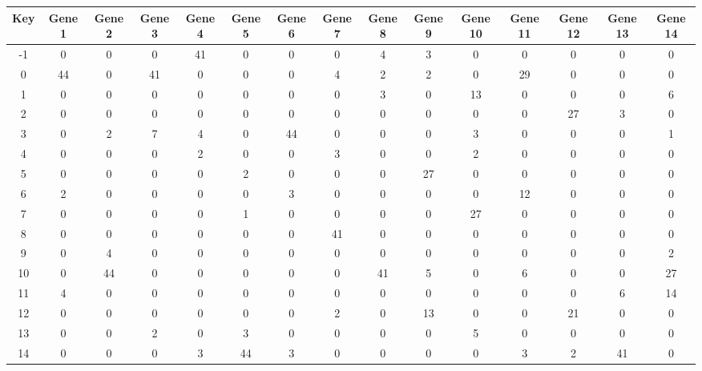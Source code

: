 \begin{tabular}{|c|c|c|c|c|c|c|c|c|c|c|c|c|c|c|}
\hline
Key & Gene 1 & Gene 2 & Gene 3 & Gene 4 & Gene 5 & Gene 6 & Gene 7 & Gene 8 & Gene 9 & Gene 10 & Gene 11 & Gene 12 & Gene 13 & Gene 14 \\
\hline
-1 & 0 & 0 & 0 & 41 & 0 & 0 & 0 & 4 & 3 & 0 & 0 & 0 & 0 & 0 \\
0 & 44 & 0 & 41 & 0 & 0 & 0 & 4 & 2 & 2 & 0 & 29 & 0 & 0 & 0 \\
1 & 0 & 0 & 0 & 0 & 0 & 0 & 0 & 3 & 0 & 13 & 0 & 0 & 0 & 6 \\
2 & 0 & 0 & 0 & 0 & 0 & 0 & 0 & 0 & 0 & 0 & 0 & 27 & 3 & 0 \\
3 & 0 & 2 & 7 & 4 & 0 & 44 & 0 & 0 & 0 & 3 & 0 & 0 & 0 & 1 \\
4 & 0 & 0 & 0 & 2 & 0 & 0 & 3 & 0 & 0 & 2 & 0 & 0 & 0 & 0 \\
5 & 0 & 0 & 0 & 0 & 2 & 0 & 0 & 0 & 27 & 0 & 0 & 0 & 0 & 0 \\
6 & 2 & 0 & 0 & 0 & 0 & 3 & 0 & 0 & 0 & 0 & 12 & 0 & 0 & 0 \\
7 & 0 & 0 & 0 & 0 & 1 & 0 & 0 & 0 & 0 & 27 & 0 & 0 & 0 & 0 \\
8 & 0 & 0 & 0 & 0 & 0 & 0 & 41 & 0 & 0 & 0 & 0 & 0 & 0 & 0 \\
9 & 0 & 4 & 0 & 0 & 0 & 0 & 0 & 0 & 0 & 0 & 0 & 0 & 0 & 2 \\
10 & 0 & 44 & 0 & 0 & 0 & 0 & 0 & 41 & 5 & 0 & 6 & 0 & 0 & 27 \\
11 & 4 & 0 & 0 & 0 & 0 & 0 & 0 & 0 & 0 & 0 & 0 & 0 & 6 & 14 \\
12 & 0 & 0 & 0 & 0 & 0 & 0 & 2 & 0 & 13 & 0 & 0 & 21 & 0 & 0 \\
13 & 0 & 0 & 2 & 0 & 3 & 0 & 0 & 0 & 0 & 5 & 0 & 0 & 0 & 0 \\
14 & 0 & 0 & 0 & 3 & 44 & 3 & 0 & 0 & 0 & 0 & 3 & 2 & 41 & 0 \\
\hline
\end{tabular}